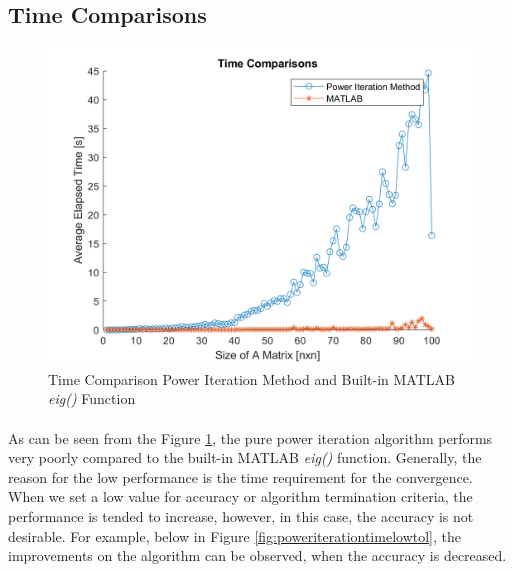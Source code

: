 \documentclass[letterpaper,12pt]{article}
\begin{document}
\subsection{Time Comparisons}
\begin{figure}[H] 
   \centering \includegraphics[width=\columnwidth]{figures/poweriterationtime.png}           
                  \caption{Time Comparison Power Iteration Method and Built-in MATLAB \textit{eig()} Function}                
                     \label{fig:poweriterationtime}
   \end{figure}

\paragraph{} As can be seen from the Figure \ref{fig:poweriterationtime}, the pure power iteration algorithm performs very poorly compared to the built-in MATLAB \textit{eig()} function. Generally, the reason for the low performance is the time requirement for the convergence. When we set a low value for accuracy or algorithm termination criteria, the performance is tended to increase, however, in this case, the accuracy is not desirable. For example, below in Figure \ref{fig:poweriterationtimelowtol}, the improvements on the algorithm can be observed, when the accuracy is decreased. 
\end{document}
